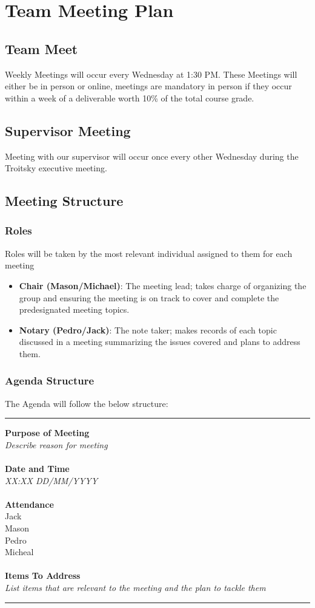 \documentclass{article}
\begin{document}
\section{Team Meeting Plan}
\subsection{Team Meet}
Weekly Meetings will occur every Wednesday at 1:30 PM. These Meetings will either be in person or online, meetings are mandatory in person if they occur within a week of a deliverable worth 10\% of the total course grade.


\subsection{Supervisor Meeting}
Meeting with our supervisor will occur once every other Wednesday during the Troitsky executive meeting.

\subsection{Meeting Structure}

\subsubsection{Roles}
Roles will be taken by the most relevant individual assigned to them for each meeting
\begin{itemize}
  \item \textbf{Chair (Mason/Michael)}: The meeting lead; takes charge of organizing the group and ensuring the meeting is on track to cover and complete the predesignated meeting topics.
  \item \textbf{Notary (Pedro/Jack)}: The note taker; makes records of each topic discussed in a meeting summarizing the issues covered and plans to address them. 
\end{itemize}

\subsubsection{Agenda Structure}

The Agenda will follow the below structure:
\\
\noindent\rule{\linewidth}{0.4pt}
\textbf{Purpose of Meeting}\\
\textit{Describe reason for meeting}\\
\\
\textbf{Date and Time}\\
\textit{XX:XX DD/MM/YYYY}\\
\\
\textbf{Attendance}\\
\Square Jack\\
\Square Mason\\
\Square Pedro\\
\Square Micheal\\
\\
\textbf{Items To Address}
\\
\textit{List items that are relevant to the meeting and the plan to tackle them}\\
\noindent\rule{\linewidth}{0.4pt}
\end{document}
